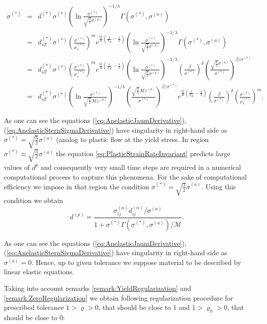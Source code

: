 \begin{eqnarray}\label{eq:AnelasticSternSigmaDerivative}
\dot{\sigma}^{(*)}&=&d^{(*)}\sigma^{(*)}\left( \ln \frac{\sigma^{(*)}}{\sqrt{\frac{3}{2}}\sigma^{(a)}}\right)^{-1/\lambda}  \Gamma(\sigma^{(*)},\sigma^{(a)})\nonumber \\
&=&d^{(*)}_{sT}\sigma^{(*)}\left(\frac{\sigma^{(*)}}{\sigma^{(*)}_s}\right)^{m} e^{\frac{Q}{R}\left(\frac{1}{T_B}-\frac{1}{T}\right)}\left( \ln \frac{\sigma^{(*)}}{\sqrt{\frac{3}{2}}\sigma^{(a)}}\right)^{-1/\lambda}  \Gamma(\sigma^{(*)},\sigma^{(a)}) \nonumber \\
&=&d^{(*)}_{sT}\sigma^{(*)}\left(\frac{\sigma^{(*)}}{\sigma^{(*)}_s}\right)^{m} e^{\frac{Q}{R}\left(\frac{1}{T_B}-\frac{1}{T}\right)}\left( \ln \frac{\sigma^{(*)}}{\sqrt{\frac{3}{2}}\sigma^{(a)}}\right)^{-1/\lambda}\left(\frac{\beta}{\sigma^{(*)}}\right)^{\delta}\left(\frac{\sqrt{\frac{3}{2}}\sigma^{(a)}}{\sigma^{(*)}}\right)^{\beta/\sigma^{(*)}} \nonumber \\
&=&
d^{(*)}_{sT}\sigma^{(*)}\left( \ln \frac{\sigma^{(*)}}{\sqrt{\frac{2}{3}}\mathcal{M}\varepsilon^{(a)}}\right)^{-1/\lambda}\!\!\!\!\left(\frac{\sqrt{\frac{2}{3}}\mathcal{M}\varepsilon^{(a)}}{\sigma^{(*)}}\right)^{\beta/\sigma^{(*)}}\!\!\!\!\!\!\!\!\!\!\!\! e^{\frac{Q}{R}\left(\frac{1}{T_B}-\frac{1}{T}\right)}\left(\frac{\beta}{\sigma^{(*)}}\right)^{\delta}\left(\frac{\sigma^{(*)}}{\sigma^{(*)}_s}\right)^{m}\!\!\!\!\!\!.
\end{eqnarray}

\begin{remark}\label{remark:YieldRegularization}
As one can see the equations (\ref{eq:AnelasticJaumDerivative}), (\ref{eq:AnelasticSternSigmaDerivative}) have singularity in right-hand side as $\sigma^{(*)}=\sqrt{\frac{3}{2}}\sigma^{(a)}$ (analog to plastic flow at the yield stress. In region $\sigma^{(*)}\approx\sqrt{\frac{3}{2}}\sigma^{(a)}$ the equation \ref{eq:PlasticStrainRateInvariant} predicts large values of $d^{p}$ and consequently very small time steps are required in a numerical computational process to capture this phenomena. For the sake of computational efficiency we impose in that region the condition $\dot{\sigma}^{(*)}=\sqrt{\frac{3}{2}}\dot{\sigma}^{(a)}$. Using this condition we obtain
\begin{equation}\label{eq:RegularizedPlasticStrainRate}
d^{(p)}=\frac{\sigma^{(a)}_{ij}d^{(n)}_{ij}/\sigma^{(a)}}{1+\sigma^{(*)}\Gamma(\sigma^{(*)},\sigma^{(a)})/\mathcal{M}}.
\end{equation}
\end{remark}
\begin{remark}\label{remark:ZeroRegularization}
As one can see the equations (\ref{eq:AnelasticJaumDerivative}), (\ref{eq:AnelasticSternSigmaDerivative}) have singularity in right-hand side as $\sigma^{(a)}=0$. Hence, up to given tolerance we suppose material to be described by linear elastic equations.
\end{remark}
Taking into  account remarks \ref{remark:YieldRegularization} and \ref{remark:ZeroRegularization} we obtain following regularization procedure for prescribed tolerance $1>\varrho>0$, that should be close to $1$ and $1>\varrho_0>0$, that should be close to $0$:


